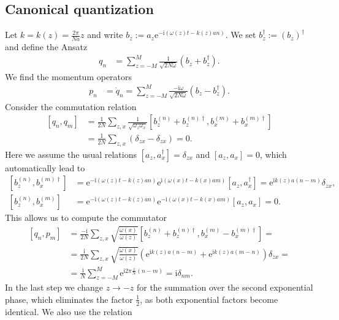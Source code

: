 \documentclass[english, parskip=full]{scrartcl}
\newcommand{\kla}{}
\newcommand{\klam}{}
\def\I{\text{i}}
\def\e{\text{e}}
\begin{document}
\subsection{Canonical quantization}
Let $k=k(z)=\frac{2\pi}{Na}z$ and write $b_z:=a_z \e^{-\I (\omega (z)t -k(z)an)}$.
We set $b_z^\dagger := (b_z)^\dagger$ and define the Ansatz
\begin{align}
q_n&=\sum_{z=-M}^M\frac{1}{\sqrt{2N\omega}}\kla\left( {b_z+b_z^\dagger} \right).
\end{align}
We find the momentum operators
\begin{align}
p_n&=\dot{q}_n=\sum_{z=-M}^M\frac{-\I\omega}{\sqrt{2N\omega}}\kla\left( {b_z-b_z^\dagger} \right).
\end{align}
Consider the commutation relation
\begin{align}
\klam\left[ {q_n,q_m} \right]&=\frac{1}{2N}\sum_{z,x}\frac{1}{\sqrt{\omega_z\omega_x}}\klam\left[ {b_z^{(n)}+b_z^{(n)\dagger},b_x^{(m)}+b_x^{(m)\dagger}} \right]\\
&=\frac{1}{2N}\sum_{z,x}\kla\left( {\delta_{zx}-\delta_{zx}} \right)=0.
\end{align}
Here we assume the usual relations $\klam\left[ {a_z,a_x^\dagger} \right]=\delta_{zx}$ and $\klam\left[ {a_z,a_x} \right]=0$, which automatically lead to
\begin{align}
\klam\left[ {b_z^{(n)},b_x^{(m)\dagger}} \right]&=\e^{-\I (\omega (z)t -k(z)an)}\e^{\I (\omega (x)t -k(x)am)}\klam\left[ {a_z,a_x^\dagger} \right]=\e^{\I k(z)a(n-m)}\delta_{zx},\\
\klam\left[ {b_z^{(n)},b_x^{(m)}} \right]&=\e^{-\I (\omega (z)t -k(z)an)}\e^{-\I (\omega (x)t -k(x)am)}\klam\left[ {a_z,a_x} \right]=0.
\end{align}
This allows us to compute the commutator
\begin{align}
\klam\left[ {q_n,p_m} \right]&=\frac{-\I}{2N}\sum_{z,x}\sqrt{\frac{\omega (x)}{\omega (z)}}\klam\left[ {b_z^{(n)}+b_z^{(n)\dagger},b_x^{(m)}-b_x^{(m)\dagger}} \right]=\\
&=\frac{\I}{2N}\sum_{z,x}\sqrt{\frac{\omega (x)}{\omega (z)}}\kla\left( {\e^{\I k(z)a(n-m)}+\e^{\I k(z)a(m-n)}} \right)\delta_{zx}=\\
&=\frac{\I}{N}\sum_{z=-M}^M\e^{\I 2\pi\frac{z}{N}(n-m)}=\I\delta_{nm}.
\end{align}
In the last step we change $z\rightarrow -z$ for the summation over the second exponential phase, which eliminates the factor $\frac{1}{2}$, as both exponential factors become identical.
We also use the relation
\end{document}
